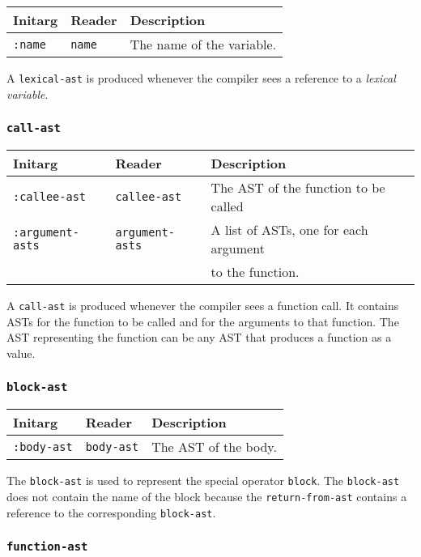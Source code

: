 \begin{tabular}{|l|l|l|}
\hline
Initarg & Reader & Description\\
\hline\hline
\texttt{:name} & \texttt{name} & The name of the variable.\\
\hline
\end{tabular}

A \texttt{lexical-ast} is produced whenever the compiler sees a
reference to a \emph{lexical variable}.

\subsubsection{\texttt{call-ast}}
\label{call-ast}

\begin{tabular}{|l|l|l|}
\hline
Initarg & Reader & Description\\
\hline\hline
\texttt{:callee-ast} & \texttt{callee-ast} & The AST of the function
to be called\\
\hline
\texttt{:argument-asts} & \texttt{argument-asts} & A list of ASTs, one
for each argument\\
& & to the function.\\
\hline
\end{tabular}

A \texttt{call-ast} is produced whenever the compiler sees a function
call.  It contains ASTs for the function to be called and for the
arguments to that function.  The AST representing the function can be
any AST that produces a function as a value.

\subsubsection{\texttt{block-ast}}
\label{block-ast}

\begin{tabular}{|l|l|l|}
\hline
Initarg & Reader & Description\\
\hline\hline
\texttt{:body-ast} & \texttt{body-ast} & The AST of the body.\\
\hline
\end{tabular}

The \texttt{block-ast} is used to represent the \commonlisp{} special operator
\texttt{block}.  The \texttt{block-ast} does not contain the name of
the block because the \texttt{return-from-ast} contains a reference to
the corresponding \texttt{block-ast}.

\subsubsection{\texttt{function-ast}}
\label{function-ast}

